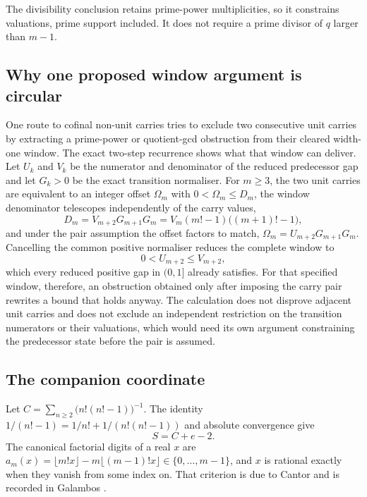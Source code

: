 \documentclass[11pt]{article}
\newcommand{\Ser}{S}
\begin{document}
The divisibility conclusion retains prime-power multiplicities, so it
constrains valuations, prime support included.  It does not require a
prime divisor of $q$ larger than $m-1$.

\subsection{Why one proposed window argument is circular}
\label{long68:sec:adjacent-unit-no-go}

One route to cofinal non-unit carries tries to exclude two consecutive unit
carries by extracting a prime-power or quotient-gcd obstruction from their
cleared width-one window.  The exact two-step recurrence shows what that
window can deliver.  Let $U_k$ and $V_k$ be the numerator and denominator of
the reduced predecessor gap and let $G_k>0$ be the exact transition
normaliser.  For $m\ge3$, the two unit carries are equivalent to an integer
offset $\Omega_m$ with $0<\Omega_m\le D_m$, the window denominator telescopes
independently of the carry values,
\[
 D_m=V_{m+2}G_{m+1}G_m=V_m(m!-1)\bigl((m+1)!-1\bigr),
\]
and under the pair assumption the offset factors to match,
$\Omega_m=U_{m+2}G_{m+1}G_m$.  Cancelling the common positive normaliser
reduces the complete window to
\[
 0<U_{m+2}\le V_{m+2},
\]
which every reduced positive gap in $(0,1]$ already satisfies.  For that
specified window, therefore, an obstruction obtained only after imposing the
carry pair rewrites a bound that holds anyway.  The calculation does not
disprove adjacent unit carries and does not exclude an independent
restriction on the transition numerators or their valuations, which would
need its own argument constraining the predecessor state before the pair is
assumed.

\subsection{The companion coordinate}

Let $C=\sum_{n\ge2}\bigl(n!(n!-1)\bigr)^{-1}$.  The identity
$1/(n!-1)=1/n!+1/(n!(n!-1))$ and absolute convergence give
\begin{equation}\label{long68:eq:companion-decomposition}
 \Ser=C+e-2 .
\end{equation}
The canonical factorial digits of a real $x$ are
$a_m(x)=\lfloor m!x\rfloor-m\lfloor(m-1)!x\rfloor\in\{0,\ldots,m-1\}$, and
$x$ is rational exactly when they vanish from some index on.  That criterion
is due to Cantor \cite{cantor1869} and is recorded in Galambos
\cite[Ch.~1]{galambos1976}.
\end{document}
